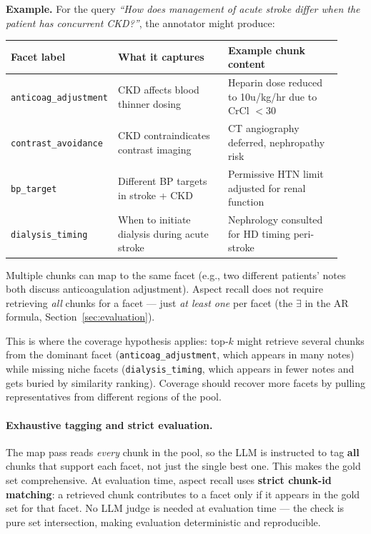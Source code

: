 \documentclass[11pt,a4paper]{article}
\begin{document}
\begin{enumerate}[leftmargin=*, itemsep=2mm]
	      \smallskip
	      \textbf{Example.} For the query \emph{``How does management of acute stroke differ when the patient has concurrent CKD?''}, the annotator might produce:

	      \smallskip
	      \small
	      \begin{tabular}{@{}p{0.2\linewidth}p{0.35\linewidth}p{0.37\linewidth}@{}}
		      \textbf{Facet label}          & \textbf{What it captures}                     & \textbf{Example chunk content}                       \\
		      \hline
		      \texttt{anticoag\_adjustment} & CKD affects blood thinner dosing              & Heparin dose reduced to 10u/kg/hr due to CrCl $< 30$ \\[3pt]
		      \texttt{contrast\_avoidance}  & CKD contraindicates contrast imaging          & CT angiography deferred, nephropathy risk            \\[3pt]
		      \texttt{bp\_target}           & Different BP targets in stroke + CKD          & Permissive HTN limit adjusted for renal function     \\[3pt]
		      \texttt{dialysis\_timing}     & When to initiate dialysis during acute stroke & Nephrology consulted for HD timing peri-stroke       \\
	      \end{tabular}
	      \normalsize
	      \smallskip

	      Multiple chunks can map to the same facet (e.g., two different patients' notes both discuss anticoagulation adjustment). Aspect recall does not require retrieving \emph{all} chunks for a facet --- just \emph{at least one} per facet (the $\exists$ in the AR formula, Section~\ref{sec:evaluation}).

	      This is where the coverage hypothesis applies: top-$k$ might retrieve several chunks from the dominant facet (\texttt{anticoag\_adjustment}, which appears in many notes) while missing niche facets (\texttt{dialysis\_timing}, which appears in fewer notes and gets buried by similarity ranking). Coverage should recover more facets by pulling representatives from different regions of the pool.

	      \paragraph{Exhaustive tagging and strict evaluation.}
	      The map pass reads \emph{every} chunk in the pool, so the LLM is instructed to tag \textbf{all} chunks that support each facet, not just the single best one. This makes the gold set comprehensive. At evaluation time, aspect recall uses \textbf{strict chunk-id matching}: a retrieved chunk contributes to a facet only if it appears in the gold set for that facet. No LLM judge is needed at evaluation time --- the check is pure set intersection, making evaluation deterministic and reproducible.


\end{enumerate}
\end{document}
